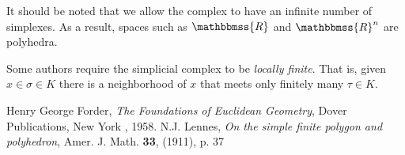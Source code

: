 \documentclass[12pt]{article}
\newcommand{\mathbb}[1]{\mathbbmss{#1}}
\begin{document}
It should be noted that we allow the complex to have an infinite number of
simplexes. As a result, spaces such as $\mathbb{R}$ and
${\mathbb{R}}^n$ are polyhedra.

Some authors require the simplicial complex to be \emph{locally finite}.
That is, given $x \in \sigma \in K$ there is a neighborhood of $x$ that meets only finitely many $\tau \in K$.

\begin{thebibliography}{99}
Henry George Forder, \emph{The Foundations of Euclidean Geometry}, Dover Publications, New York , 1958.
 N.J. Lennes, \emph{On the simple finite polygon and polyhedron}, Amer. J. Math. \textbf{33}, (1911), p. 37
\end{thebibliography}

\end{document}
